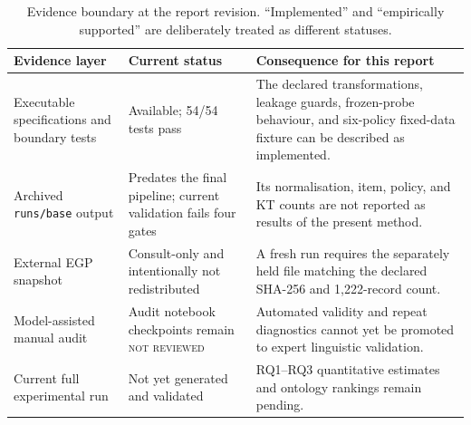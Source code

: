 \begin{table}[t]
  \centering
  \small
  \begin{tabularx}{\textwidth}{@{}
    >{\raggedright\arraybackslash}p{}
    >{\raggedright\arraybackslash}p{}
    >{\raggedright\arraybackslash}X@{}}
    \toprule
    Evidence layer & Current status & Consequence for this report \\
    \midrule
    Executable specifications and boundary tests
      & Available; 54/54 tests pass
      & The declared transformations, leakage guards, frozen-probe behaviour,
        and six-policy fixed-data fixture can be described as implemented. \\
    Archived \texttt{runs/base} output
      & Predates the final pipeline; current validation fails four gates
      & Its normalisation, item, policy, and KT counts are not reported as
        results of the present method. \\
    External EGP snapshot
      & Consult-only and intentionally not redistributed
      & A fresh run requires the separately held file matching the declared
        SHA-256 and 1,222-record count. \\
    Model-assisted manual audit
      & Audit notebook checkpoints remain \textsc{not reviewed}
      & Automated validity and repeat diagnostics cannot yet be promoted to
        expert linguistic validation. \\
    Current full experimental run
      & Not yet generated and validated
      & RQ1--RQ3 quantitative estimates and ontology rankings remain pending. \\
    \bottomrule
  \end{tabularx}
  \caption{Evidence boundary at the report revision.  ``Implemented'' and
  ``empirically supported'' are deliberately treated as different statuses.}
  \label{tab:evidence-status}
\end{table}
